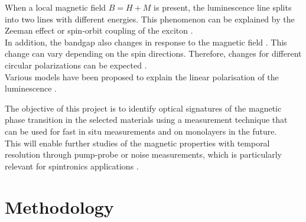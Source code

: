 \documentclass[
	oneside,
	parskip=half,
	a4paper,
]{scrbook}
\begin{document}
When a local magnetic field $B=H+M$ is present, the luminescence line splits into two lines with different energies.
This phenomenon can be explained by the Zeeman effect or spin-orbit coupling of the exciton \cite{NiPS3_exciton}.\\
In addition, the bandgap also changes in response to the magnetic field \cite{MPS_magnetism}. 
This change can vary depending on the spin directions.
Therefore, changes for different circular polarizations can be expected \cite{MPX_first_principles}.\\
Various models have been proposed to explain the linear polarisation of the luminescence \cite{NiPS3_coherent, NiPS3_linear, NiPS3_exciton, NiPS3_anisotropic}.

The objective of this project is to identify optical signatures of the magnetic phase transition in the selected materials using a measurement technique that can be used for fast in situ measurements and on monolayers in the future.\\
This will enable further studies of the magnetic properties with temporal resolution through pump-probe or noise measurements, which is particularly relevant for spintronics applications \cite{AFM_review}.



\chapter{Methodology}
\end{document}
